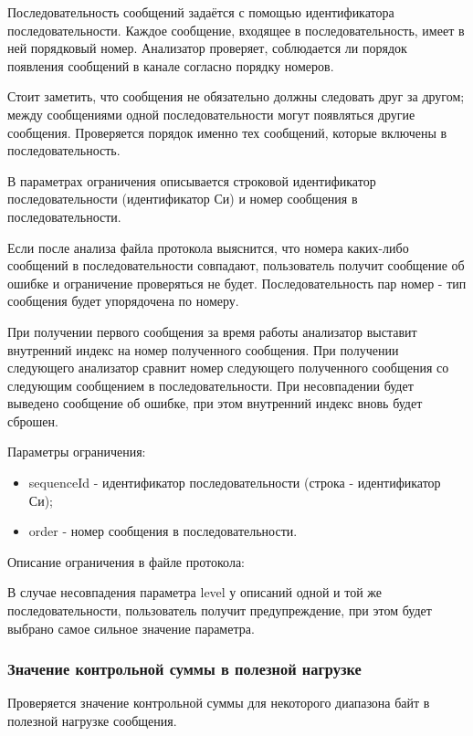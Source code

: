 Последовательность сообщений задаётся с помощью идентификатора 
последовательности. Каждое сообщение, входящее в последовательность, имеет в 
ней порядковый номер. Анализатор проверяет, соблюдается ли порядок появления 
сообщений в канале согласно порядку номеров.

Стоит заметить, что сообщения не обязательно должны следовать друг за другом; 
между сообщениями одной последовательности могут появляться другие сообщения. 
Проверяется порядок именно тех сообщений, которые включены в последовательность.

В параметрах ограничения описывается строковой идентификатор последовательности 
(идентификатор Си) и номер сообщения в последовательности. 

Если после анализа файла протокола выяснится, что номера каких-либо сообщений в 
последовательности совпадают, пользователь получит сообщение об ошибке и 
ограничение проверяться не будет. Последовательность пар номер - тип сообщения
будет упорядочена по номеру.

При получении первого сообщения за время работы анализатор выставит внутренний
индекс на номер полученного сообщения. При получении следующего анализатор
сравнит номер следующего полученного сообщения со следующим сообщением в 
последовательности. При несовпадении будет выведено сообщение об ошибке,
при этом внутренний индекс вновь будет сброшен.

Параметры ограничения:

\begin{itemize}
 \item sequenceId - идентификатор последовательности (строка - идентификатор 
Си);
 \item order - номер сообщения в последовательности.
\end{itemize}

Описание ограничения в файле протокола:



В случае несовпадения параметра level у описаний одной и той же 
последовательности, пользователь получит предупреждение, при этом будет выбрано 
самое сильное значение параметра.

\subsubsection{Значение контрольной суммы в полезной нагрузке}

Проверяется значение контрольной суммы для некоторого диапазона байт в полезной 
нагрузке сообщения.

